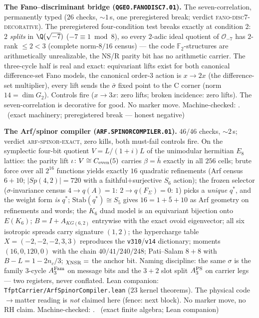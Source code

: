 \documentclass[11pt,a4paper]{article}
\theoremstyle{definition}
\begin{document}
\par\smallskip\noindent\textbf{The Fano--discriminant bridge
(\texttt{QGEO.FANODISC7.01}).}
The seven-correlation, permanently typed ($26$ checks, ${\sim}1$\,s,
one preregistered break; verdict \textsc{fano-disc7-decorative}).
The preregistered four-condition test breaks exactly at condition 2:
$2$ \emph{splits} in $\Q(\sqrt{-7})$ ($-7\equiv1\bmod8$), so every
$2$-adic ideal quotient of $\mathcal O_{-7}$ has $2$-rank
$\le2<3$ (complete norm-$8/16$ census) --- the code
$\mathbb{F}_2$-structures are arithmetically unrealizable, the
NS/R parity bit has no arithmetic carrier.  The three-cycle half is
real and exact: equivariant lifts exist for both canonical
difference-set Fano models, the canonical order-$3$ action is
$x\to2x$ (the difference-set multiplier), every lift sends the
$\bar\sigma$ fixed point to the C corner (norm $14=\dim G_2$).
Controls fire ($x\to3x$: zero lifts; broken incidence: zero lifts).
The seven-correlation is decorative for good.  No marker move.
Machine-checked: .
\mE\ (exact machinery; preregistered break --- honest negative)
\par\smallskip

\par\smallskip\noindent\textbf{The Arf/spinor compiler
(\texttt{ARF.SPINORCOMPILER.01}).}
$46/46$ checks, ${\sim}2$\,s; verdict \textsc{arf-spinor-exact},
zero kills, both must-fail controls fire.  On the symplectic
four-bit quotient $V=L/(1{+}i)L$ of the unimodular hermitian $E_8$
lattice: the parity lift $\iota\colon V\cong C_{\rm even}(5)$
carries $\beta=\bar h$ exactly in all $256$ cells; brute force
over all $2^{16}$ functions yields exactly $16$ quadratic
refinements (Arf census $6+10$; $|Sp(4,2)|=720$ with a
faithful$+$surjective $S_6$ action); the frozen selector
($\sigma$-invariance census $4\to q(A){=}1$: $2\to
q(F_\Sigma){=}0$: $1$) picks a \emph{unique} $q^{*}$, and the
weight form \emph{is} $q^{*}$; $\mathrm{Stab}(q^{*})\cong S_5$
gives $16=1+\bar 5+10$ as Arf geometry on refinements and words;
the $K_6$ duad model is an equivariant bijection onto $E(K_6)$;
$B=I+A_{KG(6,2)}$ entrywise with the exact ovoid eigenvector; all
six isotropic spreads carry signature $(1,2)$; the hypercharge
table $X=(-2,-2,-2,3,3)$ reproduces the \texttt{v310}/\texttt{v14}
dictionary; moments $(16,0,120,0)$ with the chain $40/41/240/248$;
Pati--Salam $8+8$ with $B{-}L=1-2n_c/3$; $\chi_{\rm NSR}=$ the
anchor bit.  Naming discipline: the same $\sigma$ is the family
3-cycle $A_3^{\rm Fam}$ on message bits and the $3{+}2$ slot split
$A_3^{\rm PS}$ on carrier legs --- two registers, never conflated.
Lean companion: \texttt{TfptCarrier/ArfSpinorCompiler.lean} ($23$
kernel theorems).  The physical code$\to$matter reading is
\emph{not} claimed here (fence: next block).  No marker move, no
RH claim.
Machine-checked: .
\mE\ (exact finite algebra; Lean companion)
\par\smallskip
\end{document}
